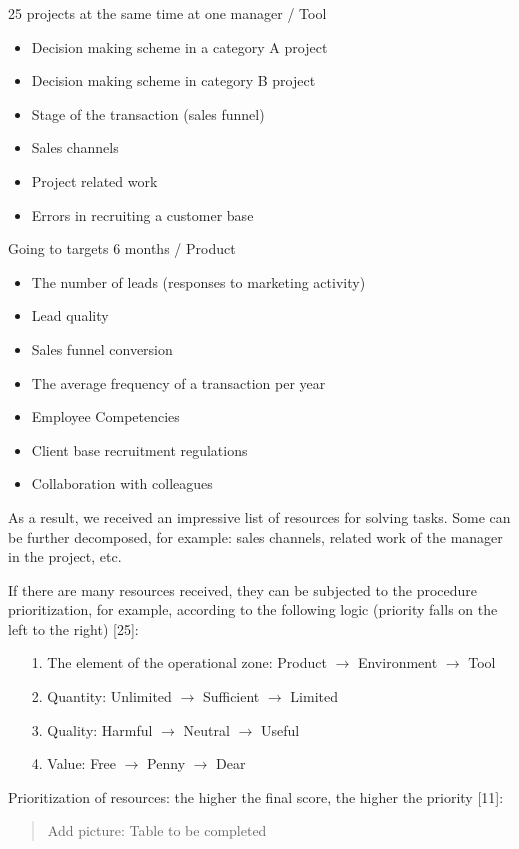 \documentclass[11pt,a4paper]{book}
\newcommand{\addpicture}[1]{
  \begin{quote} Add picture: #1\end{quote}
}
\begin{document}
25 projects at the same time at one manager / Tool

\begin{itemize}
\item Decision making scheme in a category A project
\item Decision making scheme in category B project
\item Stage of the transaction (sales funnel)
\item Sales channels
\item Project related work
\item Errors in recruiting a customer base
\end{itemize}

Going to targets 6 months / Product
\begin{itemize}
\item The number of leads (responses to marketing activity)
\item Lead quality
\item Sales funnel conversion
\item The average frequency of a transaction per year
\item Employee Competencies
\item Client base recruitment regulations
\item Collaboration with colleagues
\end{itemize}

As a result, we received an impressive list of resources for solving tasks.
Some can be further decomposed, for example: sales channels, related work of
the manager in the project, etc.

If there are many resources received, they can be subjected to the procedure
prioritization, for example, according to the following logic (priority falls
on the left to the right) [25]:
\begin{itemize}
\item[1.] The element of the operational zone: Product $\to$ Environment $\to$
  Tool
\item[2.] Quantity: Unlimited $\to$ Sufficient $\to$ Limited
\item[3.] Quality: Harmful $\to$ Neutral $\to$ Useful
\item[4.] Value: Free $\to$ Penny $\to$ Dear
\end{itemize}

Prioritization of resources: the higher the final score, the higher the
priority [11]:

\addpicture{Table to be completed}
\end{document}
